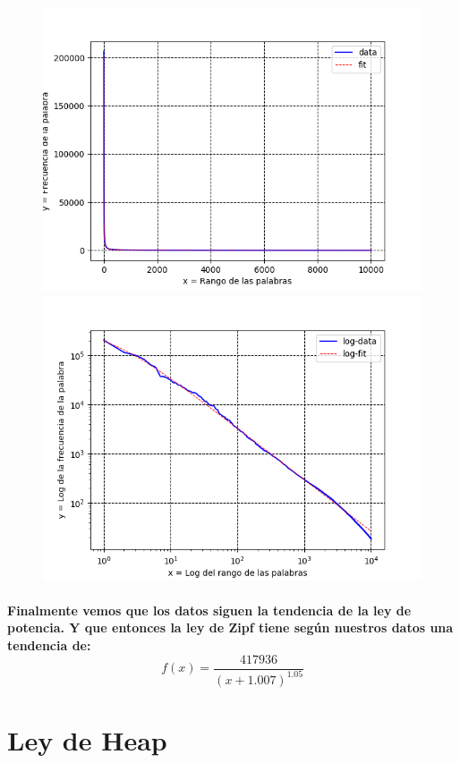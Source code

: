 \documentclass{article}
\begin{document}
 \begin{figure}[!tbp]
   \begin{minipage}[b]{0.4\textwidth}
     \includegraphics[width=\textwidth]{novels}
   \end{minipage}
   \hfill
   \begin{minipage}[b]{0.4\textwidth}
     \includegraphics[width=\textwidth]{novels-Log-Log}
   \end{minipage}
 \end{figure}
 \paragraph{
 Finalmente vemos que los datos siguen la tendencia de la ley de potencia.
 Y que entonces la ley de Zipf tiene seg\'un nuestros datos una tendencia de:
 \\
 \[ f(x) = \frac{417936}{(x+1.007)^{1.05}} \]
 }
\newpage
  \section{Ley de Heap}
\end{document}
